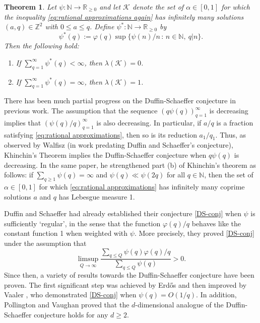 \documentclass[12pt]{amsart}
\numberwithin{equation}{section}
\newtheorem{thm}{Theorem}
\theoremstyle{definition}
\theoremstyle{remark}
\newcommand{\N}{\mathbb{N}}
\newcommand{\Z}{\mathbb{Z}}
\newcommand{\R}{\mathbb{R}}
\newcommand{\CK}{\mathcal{K}}
\renewcommand{\phi}{\varphi}
\renewcommand{\le}{\leqslant}
\renewcommand{\ge}{\geqslant}
\begin{document}
\begin{thm}\label{thm:catlin}
	Let $\psi:\N\rightarrow \R_{\ge 0}$ and let $\CK$ denote the set of $\alpha\in[0,1]$ for which the inequality \eqref{eq:rational approximations again} has infinitely many solutions $(a,q)\in\Z^2$ with $0\le a\le q$. Define $\psi^*:\N\rightarrow\R_{\ge 0}$ by
	\[
	\psi^*(q):=\phi(q)\sup\{\psi(n)/n \,:\, n\in\N,\ q|n\} .
	\]
	Then the following hold:
	\begin{enumerate}[topsep=2pt, itemsep=2pt]
		\item If $\sum_{q=1}^\infty \psi^*(q)<\infty$, then $\lambda(\CK)=0$.
		\item If $\sum_{q=1}^\infty \psi^*(q)=\infty$, then $\lambda(\CK)=1$.
	\end{enumerate}
\end{thm}


\medskip

There has been much partial progress on the Duffin-Schaeffer conjecture in previous work. The assumption that the sequence $(q\psi(q))_{q=1}^\infty$ is decreasing implies that $(\psi(q)/q)_{q=1}^\infty$ is also decreasing. In particular, if $a/q$ is a fraction satisfying \eqref{eq:rational approximations}, then so is its reduction $a_1/q_1$. Thus, as observed by Walfisz \cite{walfisz} (in work predating Duffin and Schaeffer's conjecture), Khinchin's Theorem implies the Duffin-Schaeffer conjecture when $q\psi(q)$ is decreasing. In the same paper, he strengthened part (b) of Khinchin's theorem as follows: if $\sum_{q\ge1}\psi(q)=\infty$ and $\psi(q)\ll\psi(2q)$ for all $q\in\N$, then the set of $\alpha\in[0,1]$ for which \eqref{eq:rational approximations} has infinitely many coprime solutions $a$ and $q$ has Lebesgue measure 1. 


Duffin and Schaeffer \cite{DS} had already established their conjecture \eqref{DS-conj} when $\psi$ is sufficiently `regular', in the sense that the function $\phi(q)/q$ behaves like the constant function 1 when weighted with $\psi$. More precisely, they proved \eqref{DS-conj} under the assumption that
\[
\limsup_{Q\to\infty} \frac{\sum_{q\le Q}\psi(q)\phi(q)/q}{\sum_{q\le Q}\psi(q)}>0 .
\]
Since then, a variety of results towards the Duffin-Schaeffer conjecture have been proven. The first significant step was achieved by Erd\H os \cite{erdos} and then improved by Vaaler \cite{vaaler}, who demonstrated \eqref{DS-conj} when $\psi(q)=O(1/q)$. In addition, Pollington and Vaughan \cite{PV} proved that the $d$-dimensional analogue of the Duffin-Schaeffer conjecture holds for any $d\ge2$. 
\end{document}
